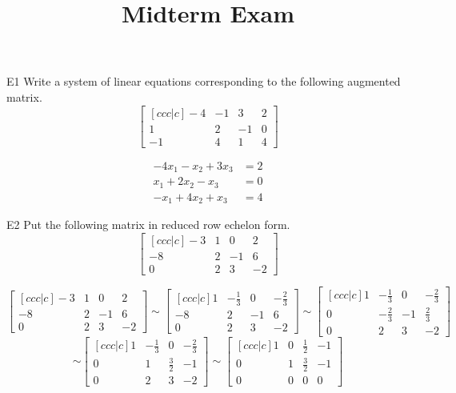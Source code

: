 \documentclass{sbgLAexam}
\title{Midterm Exam}
\begin{document}
\begin{problem}{E1}
Write a system of linear equations corresponding to the following
augmented matrix.
\[
\begin{bmatrix}[ccc|c]
-4 & -1 & 3 & 2  \\
1 & 2 & -1 & 0 \\
-1 & 4 & 1 & 4
\end{bmatrix}
\]
\end{problem}
\begin{solution}
\begin{align*}
-4x_1-x_2+3x_3&=2 \\
x_1+2x_2-x_3 &= 0 \\
-x_1+4x_2+x_3&=4
\end{align*}
\end{solution}

\begin{problem}{E2}
Put the following matrix in reduced row echelon form.
$$\begin{bmatrix}[ccc|c] -3 & 1 & 0 & 2 \\ -8 & 2 & -1 & 6 \\ 0 & 2 & 3 & -2 \end{bmatrix}$$
\end{problem}
\begin{solution}
$$\begin{bmatrix}[ccc|c]
-3 & 1 & 0 & 2 \\
 -8 & 2 & -1 & 6 \\
 0 & 2 & 3 & -2
\end{bmatrix} \sim
\begin{bmatrix}[ccc|c]
1 & -\frac{1}{3} & 0 & -\frac{2}{3} \\
 -8 & 2 & -1 & 6 \\
 0 & 2 & 3 & -2
\end{bmatrix} \sim
\begin{bmatrix}[ccc|c]
1 & -\frac{1}{3} & 0 & -\frac{2}{3} \\
 0 & -\frac{2}{3} & -1 & \frac{2}{3} \\
 0 & 2 & 3 & -2
\end{bmatrix} $$
$$\sim
\begin{bmatrix}[ccc|c]
1 & -\frac{1}{3} & 0 & -\frac{2}{3} \\
 0 & 1 & \frac{3}{2} & -1 \\
 0 & 2 & 3 & -2
\end{bmatrix} \sim
\begin{bmatrix}[ccc|c]
1 & 0 & \frac{1}{2} & -1 \\
 0 & 1 & \frac{3}{2} & -1 \\
 0 & 0 & 0 & 0
\end{bmatrix}$$
\end{solution}
\end{document}
